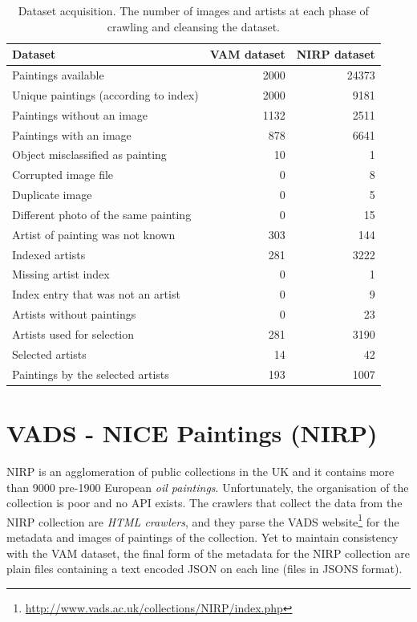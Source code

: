 \documentclass[11pt,a4paper,twoside,openright]{report}
\begin{document}
\begin{table}[ptb]
\centering
\begin{tabular}{|l|rr|}
\toprule
Dataset & VAM dataset & NIRP dataset \\
\midrule
Paintings available                   & 2000 & 24373 \\
Unique paintings (according to index) & 2000 &  9181 \\
Paintings without an image            & 1132 &  2511 \\
Paintings with an image               &  878 &  6641 \\
Object misclassified as painting      &   10 &     1 \\
Corrupted image file                  &    0 &     8 \\
Duplicate image                       &    0 &     5 \\
Different photo of the same painting  &    0 &    15 \\
Artist of painting was not known      &  303 &   144 \\
\midrule
Indexed artists                       &  281 &  3222 \\
Missing artist index                  &    0 &     1 \\
Index entry that was not an artist    &    0 &     9 \\
Artists without paintings             &    0 &    23 \\
Artists used for selection            &  281 &  3190 \\
Selected artists                      &   14 &    42 \\
\midrule
Paintings by the selected artists     &  193 &  1007 \\
\bottomrule
\end{tabular}
\caption[Dataset acquisition]{Dataset acquisition.  The number of images and
artists at each phase of crawling and cleansing the dataset.}
\label{tab:crawl}
\end{table}

\section{VADS - NICE Paintings (NIRP)}

NIRP is an agglomeration of public collections in the UK and it contains more
than 9000 pre-1900 European \emph{oil paintings}.  Unfortunately, the
organisation of the collection is poor and no API exists.  The crawlers that
collect the data from the NIRP collection are \emph{HTML crawlers}, and they
parse the VADS
website\footnote{\href{http://www.vads.ac.uk/collections/NIRP/index.php}
{http://www.vads.ac.uk/collections/NIRP/index.php}} for the metadata and images
of paintings of the collection.  Yet to maintain consistency with the VAM
dataset, the final form of the metadata for the NIRP collection are plain files
containing a text encoded JSON on each line (files in JSONS format).
\end{document}
